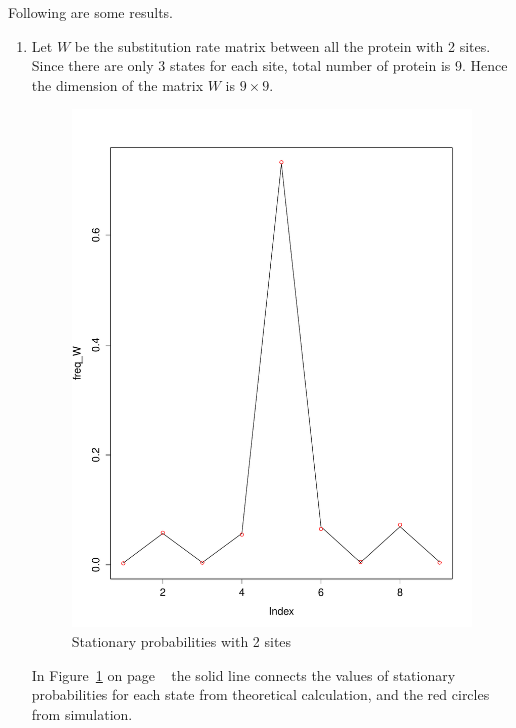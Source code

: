 \documentclass[13pt]{article}
\begin{document}
Following are some results.\\
\begin{enumerate}
\item Let $W$ be the substitution rate matrix between all the protein with 2 sites. Since there are only 3 states for each site, total number of protein is 9. Hence the dimension of the matrix $W$ is $9\times 9$.\\
\begin{figure}[here]
\centering
\includegraphics[scale=0.2]{freq_simple_sim.pdf}
\caption{Stationary probabilities with 2 sites}
\label{fig:freq2sites}
\end{figure}

In Figure~\ref{fig:freq2sites} on page ~\pageref{fig:freq2sites} the solid line connects the values of stationary probabilities for each state from theoretical calculation, and the red circles from simulation. \\


\end{enumerate}
\end{document}
